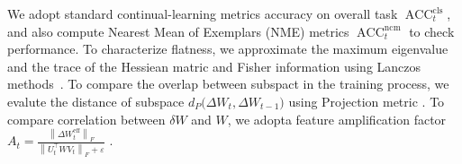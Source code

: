 \documentclass{article}
\theoremstyle{plain}
\theoremstyle{definition}
\theoremstyle{remark}
\begin{document}
We adopt standard continual-learning metrics accuracy on overall task  $\operatorname{ACC}_t^{\mathrm{cls}}$, and also  compute 
Nearest Mean of Exemplars (NME) metrics 
$\operatorname{ACC}_t^{\mathrm{ncm}}$ to check performance.
To characterize flatness, we approximate the maximum eigenvalue and the trace of the Hessiean matric and Fisher information using Lanczos methods~\cite{ghorbaniInvestigationNeuralNet2019,foretSharpnessAwareMinimizationEfficiently2021}.  
To compare the overlap between subspact in the training process, we evalute  the distance of subspace $
d_P\big(\Delta W_{t},\Delta W_{t-1}\big)
$ using Projection metric \cite{hammGrassmannDiscriminantAnalysis2008}. To compare correlation between $\delta W$ and $W$, we adopta feature amplification factor $
A_t =
\frac{\left\lVert \Delta W^{\mathrm{eff}}_{t}\right\rVert_F}
{\left\lVert U_{t}^{\top} W V_{t}\right\rVert_F+\varepsilon}
$ \cite{hu2022lora}.









\end{document}

